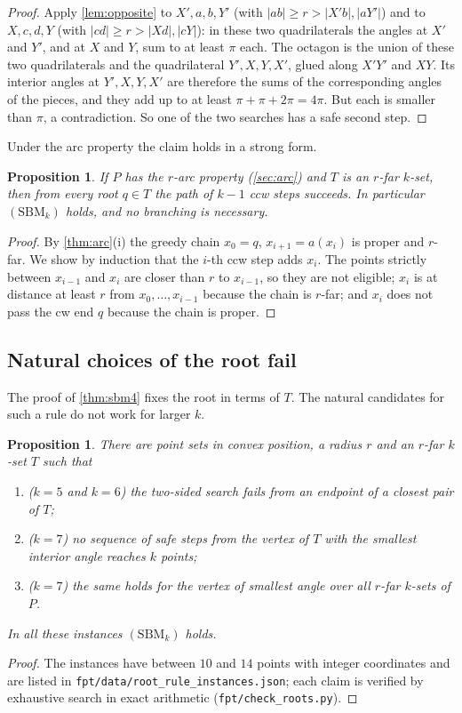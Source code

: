 \documentclass[11pt,a4paper]{article}
\newtheorem{proposition}[theorem]{Proposition}
\theoremstyle{definition}
\theoremstyle{remark}
\newcommand{\code}[1]{\nolinkurl{#1}}
\begin{document}
\begin{proof}
Apply \cref{lem:opposite} to $X',a,b,Y'$ (with $|ab|\ge r>|X'b|,|aY'|$) and to
$X,c,d,Y$ (with $|cd|\ge r>|Xd|,|cY|$): in these two quadrilaterals the angles
at $X'$ and $Y'$, and at $X$ and $Y$, sum to at least $\pi$ each. The octagon
is the union of these two quadrilaterals and the quadrilateral
$Y',X,Y,X'$, glued along $X'Y'$ and $XY$. Its interior angles at
$Y',X,Y,X'$ are therefore the sums of the corresponding angles of the pieces,
and they add up to at least $\pi+\pi+2\pi=4\pi$. But each is smaller than
$\pi$, a contradiction. So one of the two searches has a safe second step.
\end{proof}

Under the arc property the claim holds in a
strong form.

\begin{proposition}\label{prop:sbmarc}
If $P$ has the $r$-arc property (\cref{sec:arc}) and $T$ is an $r$-far
$k$-set, then from every root $q\in T$ the path of $k-1$ ccw steps
succeeds. In particular $(\mathrm{SBM}_k)$ holds, and no branching is
necessary.
\end{proposition}
\begin{proof}
By \cref{thm:arc}(i) the greedy chain $x_0=q$, $x_{i+1}=a(x_i)$ is proper and
$r$-far. We show by induction that the $i$-th ccw step adds $x_i$. The points
strictly between $x_{i-1}$ and $x_i$ are closer than $r$ to $x_{i-1}$, so they
are not eligible; $x_i$ is at distance at least $r$ from $x_0,\dots,x_{i-1}$
because the chain is $r$-far; and $x_i$ does not pass the cw end $q$ because
the chain is proper.
\end{proof}

\subsection{Natural choices of the root fail}
The proof of \cref{thm:sbm4} fixes the root in terms of $T$. The natural
candidates for such a rule do not work for larger $k$.

\begin{proposition}\label{prop:rootrules}
There are point sets in convex position, a radius $r$ and an $r$-far $k$-set
$T$ such that
\begin{enumerate}[label=(\alph*),itemsep=1pt,topsep=2pt]
\item ($k=5$ and $k=6$) the two-sided search fails from an endpoint of a
closest pair of $T$;
\item ($k=7$) no sequence of safe steps from the vertex of $T$ with the
smallest interior angle reaches $k$ points;
\item ($k=7$) the same holds for the vertex of smallest angle over all $r$-far
$k$-sets of $P$.
\end{enumerate}
In all these instances $(\mathrm{SBM}_k)$ holds.
\end{proposition}
\begin{proof}
The instances have between $10$ and $14$ points with integer coordinates and
are listed in \code{fpt/data/root_rule_instances.json}; each claim is verified
by exhaustive search in exact arithmetic (\code{fpt/check_roots.py}).
\end{proof}
\end{document}
